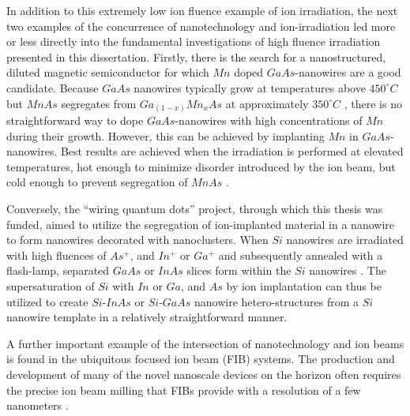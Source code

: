 In addition to this extremely low ion fluence example of ion irradiation, the next two examples of the concurrence of nanotechnology and ion-irradiation led more or less directly into the fundamental investigations of high fluence irradiation presented in this dissertation. Firstly, there is the search for a nanostructured, diluted magnetic semiconductor for which $Mn$ doped $GaAs$-nanowires are a good candidate. Because $GaAs$ nanowires typically grow at temperatures above $450^\circ C$ but $MnAs$ segregates from $Ga_{(1-x)}Mn_xAs$ at approximately $350^\circ C$ \cite{dietl_engineering_2006,sadowski_gaasmnas_2011}, there is no straightforward way to dope $GaAs$-nanowires with high concentrations of $Mn$ during their growth. However, this can be achieved by implanting $Mn$ in $GaAs$-nanowires. Best results are achieved when the irradiation is performed at elevated temperatures, hot enough to minimize disorder introduced by the ion beam, but cold enough to prevent segregation of $MnAs$ \cite{borschel_new_2011,paschoal_hopping_2012,borschel_ion-solid_2012,kumar_magnetic_2013,paschoal_magnetoresistance_2014}. 

Conversely, the ``wiring quantum dots'' project, through which this thesis was funded, aimed to utilize the segregation of ion-implanted material in a nanowire to form nanowires decorated with nanoclusters. When $Si$ nanowires are irradiated with high fluences of $As^+$, and $In^+$ or $Ga^+$ and subsequently annealed with a flash-lamp, separated $GaAs$ or $InAs$ slices form within the $Si$ nanowires \cite{prucnal_iii-v_2014,glaser_personal_2015}. The supersaturation of $Si$ with $In$ or $Ga$, and $As$ by ion implantation can thus be utilized to create $Si$-$InAs$ or $Si$-$GaAs$ nanowire hetero-structures from a $Si$ nanowire template in a relatively straightforward manner.
 
A further important example of the intersection of nanotechnology and ion beams is found in the ubiquitous focused ion beam (FIB) systems. The production and development of many of the novel nanoscale devices on the horizon often requires the precise ion beam milling that FIBs provide with a resolution of a few nanometers \cite{kranz_integrating_2001,george_nanopore_2010,chalapat_self-organized_2013}. 

